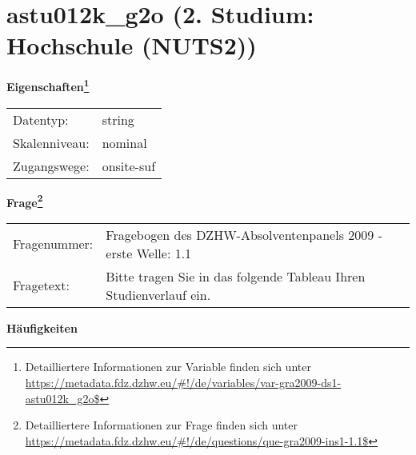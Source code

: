 
    \setcounter{footnote}{0}

    \vspace*{-1.8cm}
	\section{astu012k\_g2o (2. Studium: Hochschule (NUTS2))}
	\label{section:astu012k_g2o}



    \vspace*{0.5cm}
    \noindent\textbf{Eigenschaften\footnote{Detailliertere Informationen zur Variable finden sich unter
		\url{https://metadata.fdz.dzhw.eu/\#!/de/variables/var-gra2009-ds1-astu012k_g2o$}}}\\
	\begin{tabularx}{\hsize}{@{}lX}
	Datentyp: & string \\
	Skalenniveau: & nominal \\
	Zugangswege: &
	  onsite-suf
 \\
    \end{tabularx}



				\vspace*{0.5cm}
                \noindent\textbf{Frage\footnote{Detailliertere Informationen zur Frage finden sich unter
		              \url{https://metadata.fdz.dzhw.eu/\#!/de/questions/que-gra2009-ins1-1.1$}}}\\
				\begin{tabularx}{\hsize}{@{}lX}
					Fragenummer: &
					  Fragebogen des DZHW-Absolventenpanels 2009 - erste Welle:
					  1.1
 \\
					Fragetext: & Bitte tragen Sie in das folgende Tableau Ihren Studienverlauf ein. \\
				\end{tabularx}





        		\vspace*{0.5cm}
                \noindent\textbf{Häufigkeiten}

